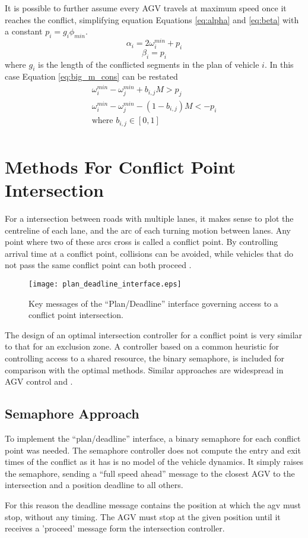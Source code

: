 It is possible to further assume every AGV travels at maximum speed once it reaches the conflict, simplifying equation Equations \ref{eq:alpha} and \ref{eq:beta} with a constant $p_i = g_i \phi_{min}$. 
\begin{equation}
\alpha_i = 2\omega_i^{min} + p_i
\end{equation}
\begin{equation}
\beta_i = p_i
\end{equation}
 where $g_i$ is the length of the conflicted segments in the plan of vehicle $i$. In this case Equation \ref{eq:big_m_cons} can be restated 
\begin{equation}
\begin{array}{cc}
\omega_i^{min} - \omega_j^{min} + b_{i,j}M > p_j \\
\omega_i^{min} - \omega_j^{min}  - (1-b_{i,j})M < -p_i \\
\textrm{where } b_{i,j}\in[0,1] \\
\end{array}
\label{eq:minlp}
\end{equation}

\section{Methods For Conflict Point Intersection}
For a intersection between roads with multiple lanes, it makes sense to plot the centreline of each lane, and the arc of each turning motion between lanes. Any point where two of these arcs cross is called a conflict point. By controlling arrival time at a conflict point, collisions can be avoided, while vehicles that do not pass the same conflict point can both proceed \cite{Levin2017}.

\begin{figure}[ht]
	\centering
	\texttt{[image: plan\_deadline\_interface.eps]}
	\caption{Key messages of the ``Plan/Deadline'' interface governing access to a conflict point intersection.}
	\label{fig:plan_deadline_interface}
\end{figure}

The design of an optimal intersection controller for a conflict point is very similar to that for an exclusion zone. A controller based on a common heuristic for controlling access to a shared resource, the binary semaphore, is included for comparison with the optimal methods.  Similar approaches are widespread in AGV control \cite{Duinkerken1999} and \cite{Lee2019}.
 
  
\subsection{Semaphore Approach}
 To implement the ``plan/deadline'' interface, a binary semaphore for each conflict point was needed. The semaphore controller does not compute the entry and exit times of the conflict as it has is no model of the vehicle dynamics. It simply raises the semaphore, sending a ``full speed ahead'' message to the closest AGV to the intersection and a position deadline to all others.
 
 For this reason the deadline message contains the position at which the agv must stop, without any timing. The AGV must stop at the given position until it receives a 'proceed' message form the intersection controller.